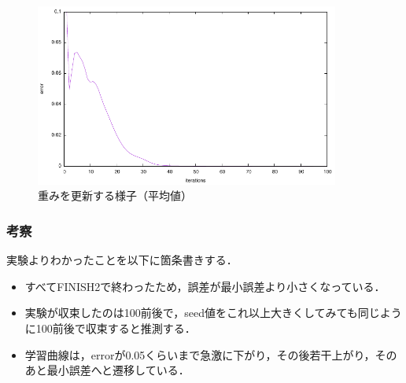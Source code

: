\begin{figure}[h]
 \begin{center}
  \includegraphics[width=10.0cm]{figs/level1/ave.pdf}
  \caption{重みを更新する様子（平均値）}
  \label{fig:level1-2}
 \end{center}
\end{figure}


\subsubsection{考察}
実験よりわかったことを以下に箇条書きする．\\
\begin{itemize}
	\item すべてFINISH2で終わったため，誤差が最小誤差より小さくなっている．
	\item 実験が収束したのは100前後で，seed値をこれ以上大きくしてみても同じように100前後で収束すると推測する．
	\item 学習曲線は，errorが0.05くらいまで急激に下がり，その後若干上がり，そのあと最小誤差へと遷移している．
\end{itemize}


